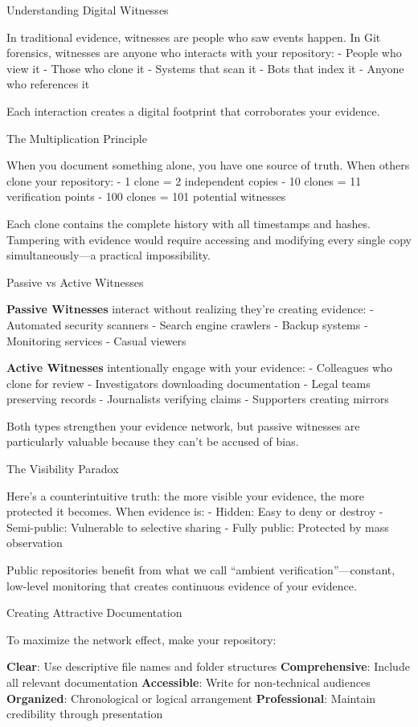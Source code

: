 Understanding Digital Witnesses

In traditional evidence, witnesses are people who saw events happen. In
Git forensics, witnesses are anyone who interacts with your repository:
- People who view it - Those who clone it - Systems that scan it - Bots
that index it - Anyone who references it

Each interaction creates a digital footprint that corroborates your
evidence.

The Multiplication Principle

When you document something alone, you have one source of truth. When
others clone your repository: - 1 clone = 2 independent copies - 10
clones = 11 verification points - 100 clones = 101 potential witnesses

Each clone contains the complete history with all timestamps and hashes.
Tampering with evidence would require accessing and modifying every
single copy simultaneously---a practical impossibility.

Passive vs Active Witnesses

\textbf{Passive Witnesses} interact without realizing they're creating
evidence: - Automated security scanners - Search engine crawlers -
Backup systems - Monitoring services - Casual viewers

\textbf{Active Witnesses} intentionally engage with your evidence: -
Colleagues who clone for review - Investigators downloading
documentation - Legal teams preserving records - Journalists verifying
claims - Supporters creating mirrors

Both types strengthen your evidence network, but passive witnesses are
particularly valuable because they can't be accused of bias.

The Visibility Paradox

Here's a counterintuitive truth: the more visible your evidence, the
more protected it becomes. When evidence is: - Hidden: Easy to deny or
destroy - Semi-public: Vulnerable to selective sharing - Fully public:
Protected by mass observation

Public repositories benefit from what we call ``ambient
verification''---constant, low-level monitoring that creates continuous
evidence of your evidence.

Creating Attractive Documentation

To maximize the network effect, make your repository:

\textbf{Clear}: Use descriptive file names and folder structures
\textbf{Comprehensive}: Include all relevant documentation
\textbf{Accessible}: Write for non-technical audiences
\textbf{Organized}: Chronological or logical arrangement
\textbf{Professional}: Maintain credibility through presentation

